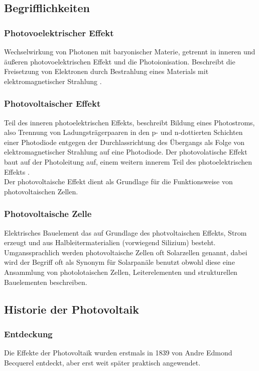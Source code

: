 \subsection{Begrifflichkeiten}
    \subsubsection{Photovoelektrischer Effekt}
        Wechselwirkung von Photonen mit baryonischer Materie, getrennt
        in inneren und äußeren photovoelektrischen Effekt und die
        Photoionisation. Beschreibt die Freisetzung von Elektronen durch
        Bestrahlung eines Materials mit elektromagnetischer Strahlung
        \cite{Wiki_PhotoelectricEffect}.

    \subsubsection{Photovoltaischer Effekt}
        Teil des inneren photoelektrischen Effekts, beschreibt Bildung
        eines Photostroms, also Trennung von Ladungsträgerpaaren in den
        p- und n-dottierten Schichten einer Photodiode entgegen der
        Durchlassrichtung des Übergangs als Folge von elektromagnetischer
        Strahlung auf eine Photodiode. Der photovolatische Effekt baut auf
        der Photoleitung auf, einem weitern innerem Teil des photoelektrischen
        Effekts \cite{Wiki_PhotoelectricEffect}.\\
        Der photovoltaische Effekt dient als Grundlage für die Funktionsweise
        von photovoltaischen Zellen.

    \subsubsection{Photovoltaische Zelle}
        Elektrisches Bauelement das auf Grundlage des photvoltaischen
        Effekts, Strom erzeugt und aus Halbleitermaterialien (vorwiegend
        Silizium) besteht.\\
        Umganssprachlich werden photovoltaische Zellen oft Solarzellen
        genannt, dabei wird der Begriff oft als Synonym für Solarpanäle
        benutzt obwohl diese eine Ansammlung von photolotaischen Zellen,
        Leiterelementen und strukturellen Bauelementen beschreiben.

\subsection{Historie der Photovoltaik}
    \subsubsection{Entdeckung}
        Die Effekte der Photovoltaik wurden erstmals in 1839 von Andre Edmond
        Becquerel entdeckt, aber erst weit später praktisch angewendet.
        \cite{Wiki_PhotovoltaicHistory}

